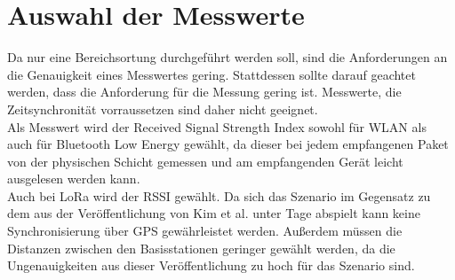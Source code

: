 \section{Auswahl der Messwerte}
Da nur eine Bereichsortung durchgeführt werden soll, sind die Anforderungen an die Genauigkeit eines Messwertes gering.
Stattdessen sollte darauf geachtet werden, dass die Anforderung für die Messung gering ist.
Messwerte, die Zeitsynchronität vorraussetzen sind daher nicht geeignet.\\
Als Messwert wird der Received Signal Strength Index sowohl für WLAN als auch für Bluetooth Low Energy gewählt, da dieser bei jedem empfangenen Paket von der physischen Schicht gemessen und am empfangenden Gerät leicht ausgelesen werden kann.\\
Auch bei LoRa wird der RSSI gewählt. 
Da sich das Szenario im Gegensatz zu dem aus der Veröffentlichung von Kim et al. unter Tage abspielt kann keine Synchronisierung über GPS gewährleistet werden. 
Außerdem müssen die Distanzen zwischen den Basisstationen geringer gewählt werden, da die Ungenauigkeiten aus dieser Veröffentlichung zu hoch für das Szenario sind.
